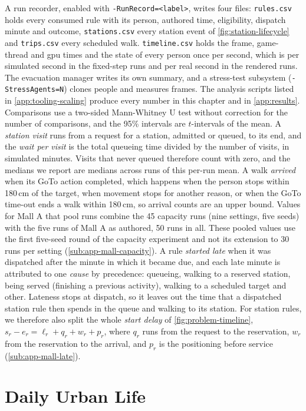 A run recorder, enabled with \texttt{-RunRecord=<label>}, writes four files: \texttt{rules.csv} holds every consumed rule with its person, authored time, eligibility, dispatch minute and outcome, \texttt{stations.csv} every station event of \cref{fig:station-lifecycle} and \texttt{trips.csv} every scheduled walk. \texttt{timeline.csv} holds the frame, game-thread and \gls{gpu} times and the state of every person once per second, which is per simulated second in the fixed-step runs and per real second in the rendered runs. The evacuation manager writes its own summary, and a stress-test subsystem (\texttt{-StressAgents=N}) clones people and measures frames. The analysis scripts listed in \cref{app:tooling-scaling} produce every number in this chapter and in \cref{app:results}. Comparisons use a two-sided Mann-Whitney U test without correction for the number of comparisons, and the 95\% intervals are $t$-intervals of the mean. A \emph{station visit} runs from a request for a station, admitted or queued, to its end, and the \emph{wait per visit} is the total queueing time divided by the number of visits, in simulated minutes. Visits that never queued therefore count with zero, and the medians we report are medians across runs of this per-run mean. A walk \emph{arrived} when its GoTo action completed, which happens when the person stops within 180\,cm of the target, when movement stops for another reason, or when the GoTo time-out ends a walk within 180\,cm, so arrival counts are an upper bound. Values for Mall A that pool runs combine the 45 capacity runs (nine settings, five seeds) with the five runs of Mall A as authored, 50 runs in all. These pooled values use the first five-seed round of the capacity experiment and not its extension to 30 runs per setting (\cref{sub:app-mall-capacity}). A rule \emph{started late} when it was dispatched after the minute in which it became due, and each late minute is attributed to one \emph{cause} by precedence: queueing, walking to a reserved station, being served (finishing a previous activity), walking to a scheduled target and other. Lateness stops at dispatch, so it leaves out the time that a dispatched station rule then spends in the queue and walking to its station. For station rules, we therefore also split the whole \emph{start delay} of \cref{fig:problem-timeline}, $s_r-e_r=\ell_r+q_r+w_r+p_r$, where $q_r$ runs from the request to the reservation, $w_r$ from the reservation to the arrival, and $p_r$ is the positioning before service (\cref{sub:app-mall-late}).

\section{Daily Urban Life}
\label{sec:app-dul}


